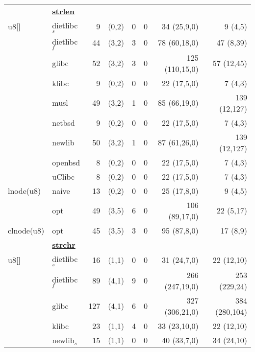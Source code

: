 \begin{table}
\begin{center}
\begin{scriptsize}
\begin{tabular}{@{\hspace{2mm}}l@{\hspace{2mm}}l@{\hspace{2mm}}r@{\hspace{2mm}}c@{\hspace{2mm}}r@{\hspace{2mm}}r@{\hspace{2mm}}r@{\hspace{2mm}}r@{\hspace{2mm}}}
& {\bf \underline{strlen}} \\
u8[]                  & dietlibc$_s$ & 9    & (0,2) & 0  & 0           & 34 (25,9,0)      & 9 (4,5)       \\
                      & dietlibc$_f$ & 44   & (3,2) & 3  & 0           & 78 (60,18,0)     & 47 (8,39)     \\
                      & glibc        & 52   & (3,2) & 3  & 0           & 125 (110,15,0)   & 57 (12,45)    \\
                      & klibc        & 9    & (0,2) & 0  & 0           & 22 (17,5,0)      & 7 (4,3)       \\
                      & musl         & 49   & (3,2) & 1  & 0           & 85 (66,19,0)     & 139 (12,127)  \\
                      & netbsd       & 9    & (0,2) & 0  & 0           & 22 (17,5,0)      & 7 (4,3)       \\
                      & newlib       & 50   & (3,2) & 1  & 0           & 87 (61,26,0)     & 139 (12,127)  \\
                      & openbsd      & 8    & (0,2) & 0  & 0           & 22 (17,5,0)      & 7 (4,3)       \\
                      & uClibc       & 8    & (0,2) & 0  & 0           & 22 (17,5,0)      & 7 (4,3)       \\
lnode(u8)             & naive        & 13   & (0,2) & 0  & 0           & 25 (17,8,0)      & 9 (4,5)       \\
                      & opt          & 49   & (3,5) & 6  & 0           & 106 (89,17,0)    & 22 (5,17)     \\
clnode(u8)            & opt          & 45   & (3,5) & 3  & 0           & 95 (87,8,0)      & 17 (8,9)      \\
& {\bf \underline{strchr}} \\
u8[]                  & dietlibc$_s$ & 16   & (1,1) & 0  & 0           &  31 (24,7,0)     & 22 (12,10)    \\
                      & dietlibc$_f$ & 89   & (4,1) & 9  & 0           & 266 (247,19,0)   & 253 (229,24)  \\
                      & glibc        & 127  & (4,1) & 6  & 0           & 327 (306,21,0)   & 384 (280,104) \\
                      & klibc        & 23   & (1,1) & 4  & 0           & 33 (23,10,0)     & 22 (12,10)    \\
                      & newlib$_s$   & 15   & (1,1) & 0  & 0           & 40 (33,7,0)      & 34 (24,10)    \\

\end{tabular}
\end{scriptsize}
\end{center}
\end{table}
